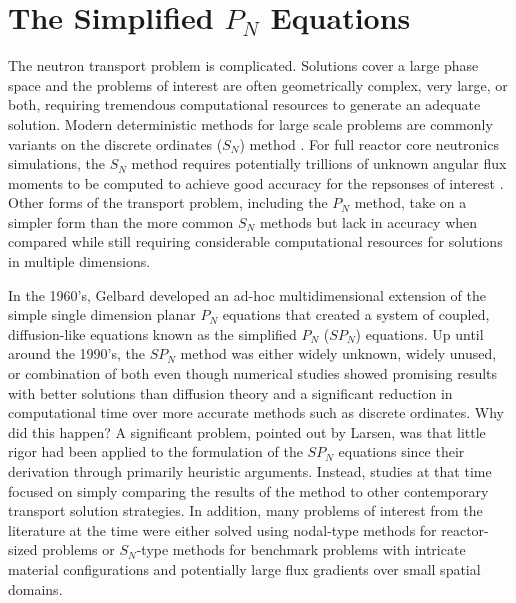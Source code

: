 \chapter{The Simplified $P_N$ Equations}
\label{ch:spn_equations}

The neutron transport problem is complicated. Solutions cover a large
phase space and the problems of interest are often geometrically
complex, very large, or both, requiring tremendous computational
resources to generate an adequate solution. Modern deterministic
methods for large scale problems are commonly variants on the discrete
ordinates ($S_N$) method \citep{evans_denovo:_2010}. For full reactor
core neutronics simulations, the $S_N$ method requires potentially
trillions of unknown angular flux moments to be computed to achieve
good accuracy for the repsonses of interest
\citep{slaybaugh_acceleration_2011}. Other forms of the transport
problem, including the $P_N$ method, take on a simpler form than the
more common $S_N$ methods but lack in accuracy when compared while
still requiring considerable computational resources for solutions in
multiple dimensions.

In the 1960's, Gelbard developed an ad-hoc multidimensional extension
of the simple single dimension planar $P_N$ equations that created a
system of coupled, diffusion-like equations known as the simplified
$P_N$ ($SP_N$) equations. Up until around the 1990's, the $SP_N$
method was either widely unknown, widely unused, or combination of
both even though numerical studies showed promising results with
better solutions than diffusion theory and a significant reduction in
computational time over more accurate methods such as discrete
ordinates. Why did this happen? A significant problem, pointed out by
Larsen, was that little rigor had been applied to the formulation of
the $SP_N$ equations since their derivation through primarily
heuristic arguments. Instead, studies at that time focused on simply
comparing the results of the method to other contemporary transport
solution strategies. In addition, many problems of interest from the
literature at the time were either solved using nodal-type methods for
reactor-sized problems or $S_N$-type methods for benchmark problems
with intricate material configurations and potentially large flux
gradients over small spatial domains.

